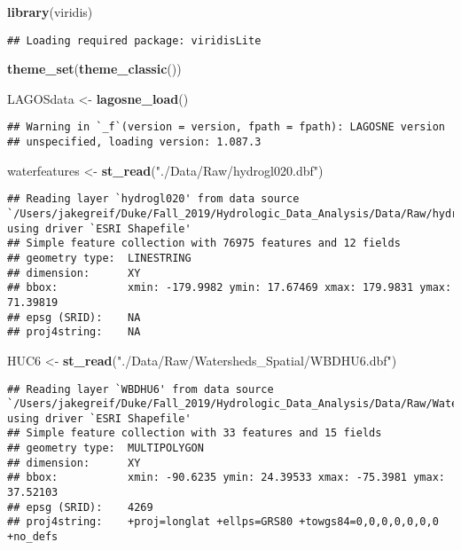 \documentclass[]{article}
\newenvironment{Shaded}{\begin{snugshade}}{\end{snugshade}}
\newcommand{\KeywordTok}[1]{\textcolor[rgb]{0.13,0.29,0.53}{\textbf{#1}}}
\newcommand{\NormalTok}[1]{#1}
\newcommand{\StringTok}[1]{\textcolor[rgb]{0.31,0.60,0.02}{#1}}
\begin{document}
\begin{Shaded}
\begin{Highlighting}[]
\KeywordTok{library}\NormalTok{(viridis)}
\end{Highlighting}
\end{Shaded}

\begin{verbatim}
## Loading required package: viridisLite
\end{verbatim}

\begin{Shaded}
\begin{Highlighting}[]
\KeywordTok{theme_set}\NormalTok{(}\KeywordTok{theme_classic}\NormalTok{())}

\NormalTok{LAGOSdata <-}\StringTok{ }\KeywordTok{lagosne_load}\NormalTok{()}
\end{Highlighting}
\end{Shaded}

\begin{verbatim}
## Warning in `_f`(version = version, fpath = fpath): LAGOSNE version
## unspecified, loading version: 1.087.3
\end{verbatim}

\begin{Shaded}
\begin{Highlighting}[]
\NormalTok{waterfeatures <-}\StringTok{ }\KeywordTok{st_read}\NormalTok{(}\StringTok{"./Data/Raw/hydrogl020.dbf"}\NormalTok{)}
\end{Highlighting}
\end{Shaded}

\begin{verbatim}
## Reading layer `hydrogl020' from data source `/Users/jakegreif/Duke/Fall_2019/Hydrologic_Data_Analysis/Data/Raw/hydrogl020.dbf' using driver `ESRI Shapefile'
## Simple feature collection with 76975 features and 12 fields
## geometry type:  LINESTRING
## dimension:      XY
## bbox:           xmin: -179.9982 ymin: 17.67469 xmax: 179.9831 ymax: 71.39819
## epsg (SRID):    NA
## proj4string:    NA
\end{verbatim}

\begin{Shaded}
\begin{Highlighting}[]
\NormalTok{HUC6 <-}\StringTok{ }\KeywordTok{st_read}\NormalTok{(}\StringTok{"./Data/Raw/Watersheds_Spatial/WBDHU6.dbf"}\NormalTok{)}
\end{Highlighting}
\end{Shaded}

\begin{verbatim}
## Reading layer `WBDHU6' from data source `/Users/jakegreif/Duke/Fall_2019/Hydrologic_Data_Analysis/Data/Raw/Watersheds_Spatial/WBDHU6.dbf' using driver `ESRI Shapefile'
## Simple feature collection with 33 features and 15 fields
## geometry type:  MULTIPOLYGON
## dimension:      XY
## bbox:           xmin: -90.6235 ymin: 24.39533 xmax: -75.3981 ymax: 37.52103
## epsg (SRID):    4269
## proj4string:    +proj=longlat +ellps=GRS80 +towgs84=0,0,0,0,0,0,0 +no_defs
\end{verbatim}
\end{document}
